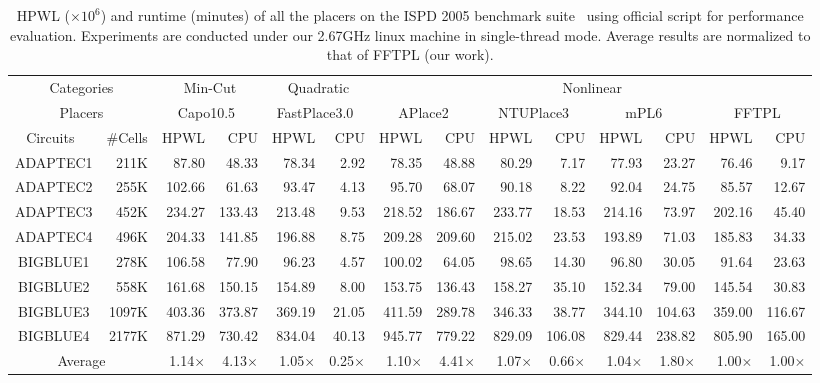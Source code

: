 \documentclass[conference,10pt]{IEEEtran}
\begin{document}
\begin{table*}[htb]
\caption{HPWL ($\times 10^6$) and runtime (minutes) of all the placers on the ISPD 2005 benchmark suite~\cite{ispd05} 
using official script for performance evaluation.
Experiments are conducted under our 2.67GHz linux machine in single-thread mode. 
Average results are normalized to that of FFTPL (our work).}
\begin{small}
\begin{center}
\begin{tabular}{|c|r|r|r|r|r|r|r|r|r|r|r|r|r|} 
\hline
\multicolumn{2}{|c|}{Categories}   &
\multicolumn{2}{|c|}{Min-Cut}      &
\multicolumn{2}{|c|}{Quadratic}    &
\multicolumn{8}{|c|}{Nonlinear}   \\ \cline{1-14}
\multicolumn{2}{|c|}{Placers}      & 
\multicolumn{2}{|c|}{Capo10.5~\cite{capo}}     &
\multicolumn{2}{|c|}{FastPlace3.0~\cite{fp3}} & 
\multicolumn{2}{|c|}{APlace2~\cite{aplace2}}      &
\multicolumn{2}{|c|}{NTUPlace3~\cite{ntupl3}}    &
\multicolumn{2}{|c|}{mPL6~\cite{mpl6}}         & 
\multicolumn{2}{|c|}{FFTPL}       \\ \hline
Circuits~\cite{ispd05} &\#Cells& HPWL & CPU  & HPWL & CPU  & HPWL & CPU  & HPWL & CPU  & HPWL & CPU & HPWL & CPU \\ \hline
ADAPTEC1   & 211K  & 87.80& 48.33& 78.34& 2.92 & 78.35& 48.88& 80.29& 7.17 & 77.93& 23.27 & 76.46 &  9.17 \\ \hline
ADAPTEC2   & 255K  &102.66& 61.63& 93.47& 4.13 & 95.70& 68.07& 90.18& 8.22 & 92.04& 24.75 & 85.57 & 12.67 \\ \hline
ADAPTEC3   & 452K  &234.27&133.43&213.48& 9.53 &218.52&186.67&233.77& 18.53&214.16& 73.97 & 202.16& 45.40 \\ \hline
ADAPTEC4   & 496K  &204.33&141.85&196.88& 8.75 &209.28&209.60&215.02& 23.53&193.89& 71.03 & 185.83& 34.33 \\ \hline
BIGBLUE1   & 278K  &106.58& 77.90& 96.23& 4.57 &100.02& 64.05& 98.65& 14.30& 96.80& 30.05 & 91.64 & 23.63 \\ \hline
BIGBLUE2   & 558K  &161.68&150.15&154.89& 8.00 &153.75&136.43&158.27& 35.10&152.34& 79.00 & 145.54& 30.83 \\ \hline
BIGBLUE3   & 1097K &403.36&373.87&369.19& 21.05&411.59&289.78&346.33& 38.77&344.10& 104.63& 359.00& 116.67\\ \hline
BIGBLUE4   & 2177K &871.29&730.42&834.04& 40.13&945.77&779.22&829.09&106.08&829.44& 238.82& 805.90& 165.00\\ \hline \hline
\multicolumn{2}{|c|}{Average}  &1.14$\times$  &4.13$\times$  &1.05$\times$  & 0.25$\times$ & 1.10$\times$ & 4.41$\times$ & 1.07$\times$ & 0.66$\times$ & 1.04$\times$ & 1.80$\times$  & 1.00$\times$  & 1.00$\times$  \\ \hline
\end{tabular}
\label{tab:res}
\end{center}
\end{small}
\end{table*}
\end{document}
